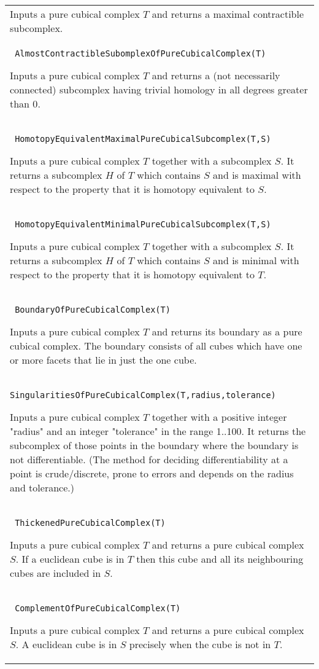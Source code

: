 \documentclass[a4paper,11pt]{report}
\begin{document}
{\begin{center}
\begin{tabular}{|l|}
 Inputs a pure cubical complex $T$ and returns a maximal contractible subcomplex. \\
 \index{AlmostContractibleSubomplexOfPureCubicalComplex} \texttt{ AlmostContractibleSubomplexOfPureCubicalComplex(T)} 

 Inputs a pure cubical complex $T$ and returns a (not necessarily connected) subcomplex having trivial homology
in all degrees greater than $0$. \\
 \index{HomotopyEquivalentMaximalPureCubicalSubcomplex} \texttt{ HomotopyEquivalentMaximalPureCubicalSubcomplex(T,S)} 

 Inputs a pure cubical complex $T$ together with a subcomplex $S$. It returns a subcomplex $H$ of $T$ which contains $S$ and is maximal with respect to the property that it is homotopy equivalent to $S$. \\
 \index{HomotopyEquivalentMinimalPureCubicalSubcomplex} \texttt{ HomotopyEquivalentMinimalPureCubicalSubcomplex(T,S)} 

 Inputs a pure cubical complex $T$ together with a subcomplex $S$. It returns a subcomplex $H$ of $T$ which contains $S$ and is minimal with respect to the property that it is homotopy equivalent to $T$. \\
 \index{BoundaryOfPureCubicalComplex} \texttt{ BoundaryOfPureCubicalComplex(T)} 

 Inputs a pure cubical complex $T$ and returns its boundary as a pure cubical complex. The boundary consists of
all cubes which have one or more facets that lie in just the one cube. \\
 \index{SingularitiesOfPureCubicalComplex} \texttt{SingularitiesOfPureCubicalComplex(T,radius,tolerance)} 

 Inputs a pure cubical complex $T$ together with a positive integer "radius" and an integer "tolerance" in the
range 1..100. It returns the subcomplex of those points in the boundary where
the boundary is not differentiable. (The method for deciding differentiability
at a point is crude/discrete, prone to errors and depends on the radius and
tolerance.) \\
 \index{ThickenedPureCubicalComplex} \texttt{ ThickenedPureCubicalComplex(T)} 

 Inputs a pure cubical complex $T$ and returns a pure cubical complex $S$. If a euclidean cube is in $T$ then this cube and all its neighbouring cubes are included in $S$. \\
 \index{ComplementOfPureCubicalComplex} \texttt{ ComplementOfPureCubicalComplex(T)} 

 Inputs a pure cubical complex $T$ and returns a pure cubical complex $S$. A euclidean cube is in $S$ precisely when the cube is not in $T$. \\
\end{tabular}\\[2mm]
\end{center}

 }
\end{document}
